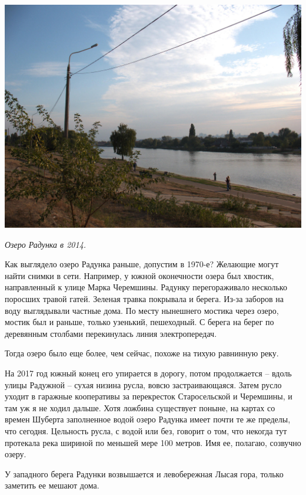 \begin{center}
\includegraphics[width=\linewidth]{chast-gorodki/radujnoe/s_raduj-CRW_4036.jpg}

\textit{Озеро Радунка в 2014.}
\end{center}


Как выглядело озеро Радунка раньше, допустим в 1970-е? Желающие могут найти снимки в сети. Например, у южной оконечности озера был хвостик, направленный к улице Марка Черемшины. Радунку перегораживало несколько поросших травой гатей. Зеленая травка покрывала и берега. Из-за заборов на воду выглядывали частные дома. По месту нынешнего мостика через озеро, мостик был и раньше, только узенький, пешеходный. С берега на берег по деревянным столбами перекинулась линия электропередач.

Тогда озеро было еще более, чем сейчас, похоже на тихую равнинную реку.

На 2017 год южный конец его упирается в дорогу, потом продолжается – вдоль улицы Радужной – сухая низина русла, вовсю застраивающаяся. Затем русло уходит в гаражные кооперативы за перекресток Старосельской и Черемшины, и там уж я не ходил дальше. Хотя ложбина существует поныне, на картах со времен Шуберта заполненное водой озеро Радунка имеет почти те же пределы, что сегодня. Цельность русла, с водой или без, говорит о том, что некогда тут протекала река шириной по меньшей мере 100 метров. Имя ее, полагаю, созвучно озеру.


У западного берега Радунки возвышается и левобережная Лысая гора, только заметить ее мешают дома.
